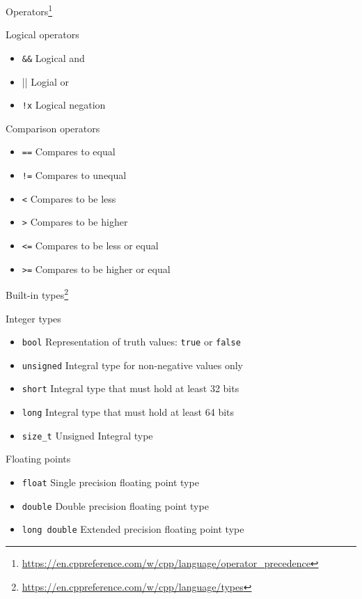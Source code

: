 \documentclass[12pt]{beamer}
\begin{document}
\begin{frame}{Operators\footnote{\tiny\url{https://en.cppreference.com/w/cpp/language/operator_precedence}}}
\begin{block}{Logical operators}
\begin{itemize}
\item \lstinline|&&| Logical and
\item \lstinline|||| Logial or
\item \lstinline|!x| Logical negation 
\end{itemize}
\end{block}
\begin{block}{Comparison operators}
\begin{itemize}
\item \lstinline|==|  Compares to equal
\item \lstinline|!=| Compares to unequal
\item \lstinline|<| Compares to be less
\item \lstinline|>| Compares to be higher
\item \lstinline|<=| Compares to be less or equal
\item \lstinline|>=| Compares to be higher or equal
\end{itemize}
\end{block}
\end{frame}

\begin{frame}{Built-in types\footnote{\tiny\url{https://en.cppreference.com/w/cpp/language/types}}}
\begin{block}{Integer types}
\begin{itemize}
\item \lstinline|bool| Representation of truth values: \lstinline|true| or \lstinline|false| 
\item \lstinline|unsigned| Integral type for non-negative values only 
\item \lstinline|short| Integral type that must hold at least 32 bits
\item \lstinline|long| Integral type that must hold at least 64 bits
\item \lstinline|size_t| Unsigned Integral type
\end{itemize}
\end{block}

\begin{block}{Floating points}
\begin{itemize}
\item \lstinline|float| Single precision floating point type
\item \lstinline|double| Double precision floating point type
\item \lstinline|long double| Extended precision floating point type
\end{itemize}
\end{block}

\end{frame}
\end{document}
